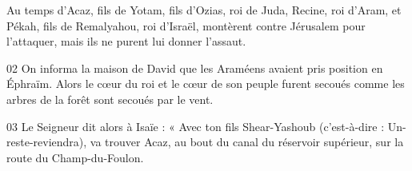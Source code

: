  Au temps d’Acaz, fils de Yotam, fils d’Ozias, roi de Juda, Recine, roi d’Aram, et Pékah, fils de Remalyahou, roi d’Israël, montèrent contre Jérusalem pour l’attaquer, mais ils ne purent lui donner l’assaut.

02 On informa la maison de David que les Araméens avaient pris position en Éphraïm. Alors le cœur du roi et le cœur de son peuple furent secoués comme les arbres de la forêt sont secoués par le vent.

03 Le Seigneur dit alors à Isaïe : « Avec ton fils Shear-Yashoub (c’est-à-dire : Un-reste-reviendra), va trouver Acaz, au bout du canal du réservoir supérieur, sur la route du Champ-du-Foulon.
